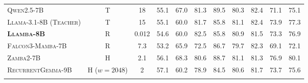 \begin{table}[H]
\begin{tabular}{l c c c c c c c c c c}
        \midrule

        \textsc{Qwen2.5-7B} & T & 18 & 55.1 & 67.0 & 81.3 & 89.5 & 80.3 & 82.4 & 71.1 & 75.1 \\
        \textsc{Llama-3.1-8B (Teacher)} & T & 15         & 55.1 & 60.0 & 81.7 & 85.8 & 81.1 & 82.4 & 73.9 & 77.3 \\
        \textbf{\textsc{Llamba-8B}}      & R & 0.012      & 54.6 & 60.0 & 82.5 & 85.8 & 80.9 & 81.5 & 73.3 & 76.9 \\
        \textsc{Falcon3-Mamba-7B}       & R & 7.3        & 53.2 & 65.9 & 72.5 & 86.7 & 79.7 & 82.3 & 69.1 & 72.1 \\
        \textsc{Zamba2-7B}             & H & 2.1        & 56.1 & 68.3 & 80.6 & 88.7 & 81.1 & 81.3 & 76.9 & 80.1 \\
        \textsc{RecurrentGemma-9B}      & H ($w=2048$) & 2       & 57.1 & 60.2 & 78.9 & 84.5 & 80.6 & 81.7 & 73.7 & 75.6 \\
        \bottomrule
        \multicolumn{11}{l}{} \\
    \end{tabular}
\end{table}

